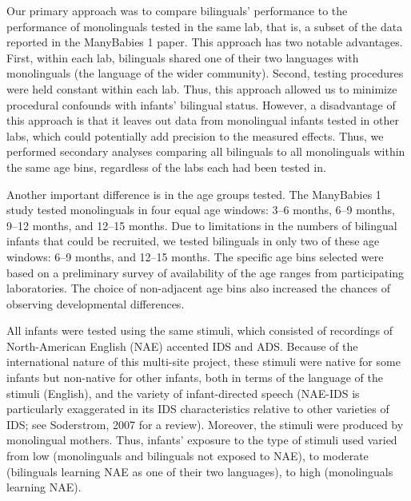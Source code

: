\documentclass[english,,man,floatsintext]{apa6}
\begin{document}
Our primary approach was to compare bilinguals' performance to the performance of monolinguals tested in the same lab, that is, a subset of the data reported in the ManyBabies 1 paper. This approach has two notable advantages. First, within each lab, bilinguals shared one of their two languages with monolinguals (the language of the wider community). Second, testing procedures were held constant within each lab. Thus, this approach allowed us to minimize procedural confounds with infants' bilingual status. However, a disadvantage of this approach is that it leaves out data from monolingual infants tested in other labs, which could potentially add precision to the measured effects. Thus, we performed secondary analyses comparing all bilinguals to all monolinguals within the same age bins, regardless of the labs each had been tested in.

Another important difference is in the age groups tested. The ManyBabies 1 study tested monolinguals in four equal age windows: 3--6 months, 6--9 months, 9--12 months, and 12--15 months. Due to limitations in the numbers of bilingual infants that could be recruited, we tested bilinguals in only two of these age windows: 6--9 months, and 12--15 months. The specific age bins selected were based on a preliminary survey of availability of the age ranges from participating laboratories. The choice of non-adjacent age bins also increased the chances of observing developmental differences.

All infants were tested using the same stimuli, which consisted of recordings of North-American English (NAE) accented IDS and ADS. Because of the international nature of this multi-site project, these stimuli were native for some infants but non-native for other infants, both in terms of the language of the stimuli (English), and the variety of infant-directed speech (NAE-IDS is particularly exaggerated in its IDS characteristics relative to other varieties of IDS; see Soderstrom, 2007 for a review). Moreover, the stimuli were produced by monolingual mothers. Thus, infants' exposure to the type of stimuli used varied from low (monolinguals and bilinguals not exposed to NAE), to moderate (bilinguals learning NAE as one of their two languages), to high (monolinguals learning NAE).
\end{document}
